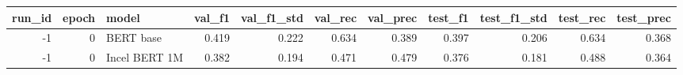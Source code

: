 \begin{tabular}{rrlrrrrrrrr}
\toprule
 run\_id &  epoch &         model &  val\_f1 &  val\_f1\_std &  val\_rec &  val\_prec &  test\_f1 &  test\_f1\_std &  test\_rec &  test\_prec \\
\midrule
     -1 &      0 &     BERT base &   0.419 &       0.222 &    0.634 &     0.389 &    0.397 &        0.206 &     0.634 &      0.368 \\
     -1 &      0 & Incel BERT 1M &   0.382 &       0.194 &    0.471 &     0.479 &    0.376 &        0.181 &     0.488 &      0.364 \\
\bottomrule
\end{tabular}
